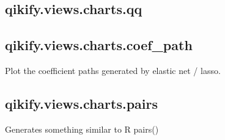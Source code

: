 \documentclass[letterpaper,10pt,english]{sphinxmanual}
\begin{document}
\subsection{qikify.views.charts.qq}
\label{generated/qikify.views.charts.qq:qikify-views-charts-qq}\label{generated/qikify.views.charts.qq::doc}

\begin{fulllineitems}
\label{generated/qikify.views.charts.qq:qikify.views.charts.qq}
\end{fulllineitems}



\subsection{qikify.views.charts.coef\_path}
\label{generated/qikify.views.charts.coef_path::doc}\label{generated/qikify.views.charts.coef_path:qikify-views-charts-coef-path}

\begin{fulllineitems}
\label{generated/qikify.views.charts.coef_path:qikify.views.charts.coef_path}
Plot the coefficient paths generated by elastic net / lasso.

\end{fulllineitems}



\subsection{qikify.views.charts.pairs}
\label{generated/qikify.views.charts.pairs:qikify-views-charts-pairs}\label{generated/qikify.views.charts.pairs::doc}

\begin{fulllineitems}
\label{generated/qikify.views.charts.pairs:qikify.views.charts.pairs}
Generates something similar to R pairs()

\end{fulllineitems}
\end{document}
